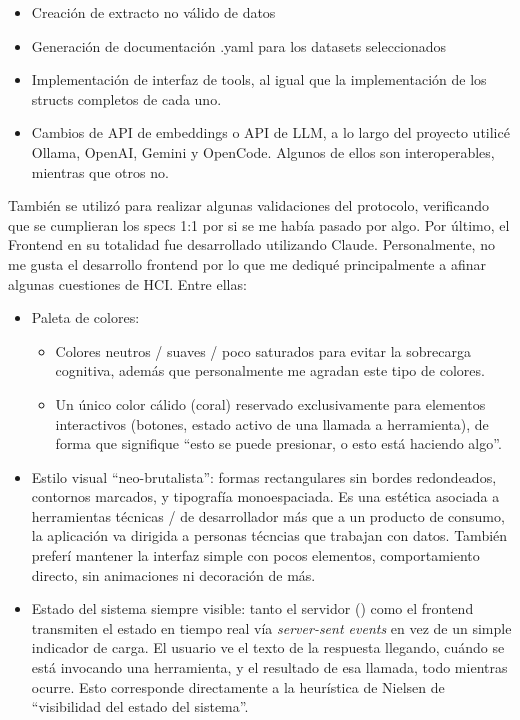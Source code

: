 \documentclass[11pt]{article}
\newcommand{\code}[1]{\texttt{\seqsplit{#1}}}
\begin{document}
\begin{itemize}
  \item Creación de extracto no válido de datos
  \item Generación de documentación .yaml para los datasets seleccionados
  \item Implementación de interfaz de tools, al igual que la implementación de los
    structs completos de cada uno.
  \item Cambios de API de embeddings o API de LLM, a lo largo del proyecto utilicé Ollama, OpenAI, Gemini y
    OpenCode. Algunos de ellos son interoperables, mientras que otros no.
\end{itemize}

También se utilizó para realizar algunas validaciones del protocolo, verificando que se cumplieran los specs 1:1 por si
se me había pasado por algo. Por último, el Frontend en su totalidad fue desarrollado utilizando Claude. Personalmente, no
me gusta el desarrollo frontend por lo que me dediqué principalmente a afinar algunas cuestiones de HCI. Entre ellas:

\begin{itemize}
  \item Paleta de colores:
    \begin{itemize}
      \item Colores neutros / suaves / poco saturados para evitar la sobrecarga cognitiva, además que personalmente
        me agradan este tipo de colores.
      \item Un único color cálido (coral) reservado exclusivamente para elementos interactivos (botones, estado
        activo de una llamada a herramienta), de forma que signifique ``esto se puede presionar, o esto está
        haciendo algo''.
    \end{itemize}
  \item Estilo visual ``neo-brutalista'': formas rectangulares sin bordes redondeados, contornos marcados, y
    tipografía monoespaciada. Es una estética asociada a herramientas técnicas / de desarrollador más que a un
    producto de consumo, la aplicación va dirigida a personas técncias que trabajan con datos. También
    preferí mantener la interfaz simple con pocos elementos, comportamiento directo, sin animaciones ni decoración
    de más.
  \item Estado del sistema siempre visible: tanto el servidor (\code{cmd/host}) como el frontend transmiten el
    estado en tiempo real vía \emph{server-sent events} en vez de un simple indicador de carga. El usuario ve
    el texto de la respuesta llegando, cuándo se está invocando una herramienta, y el resultado de esa llamada,
    todo mientras ocurre. Esto corresponde directamente a la heurística de Nielsen de ``visibilidad del estado
    del sistema''.
\end{itemize}
\end{document}
